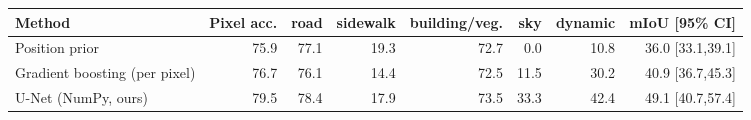 \begin{tabular}{lrrrrrrr}
\toprule
Method & Pixel acc. & road & sidewalk & building/veg. & sky & dynamic & mIoU [95\% CI] \\
\midrule
Position prior & 75.9 & 77.1 & 19.3 & 72.7 & 0.0 & 10.8 & 36.0 [33.1,39.1] \\
Gradient boosting (per pixel) & 76.7 & 76.1 & 14.4 & 72.5 & 11.5 & 30.2 & 40.9 [36.7,45.3] \\
U-Net (NumPy, ours) & 79.5 & 78.4 & 17.9 & 73.5 & 33.3 & 42.4 & 49.1 [40.7,57.4] \\
\bottomrule
\end{tabular}
